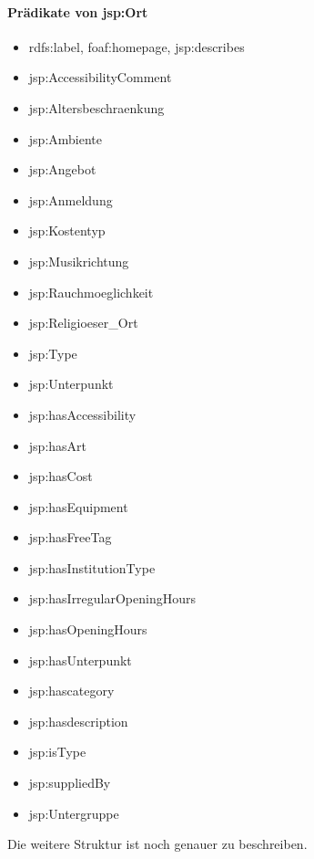 \documentclass[a4paper,11pt]{article}
\begin{document}
\paragraph{Prädikate von jsp:Ort}
\begin{itemize}
\item rdfs:label, foaf:homepage, jsp:describes
\item jsp:AccessibilityComment
\item jsp:Altersbeschraenkung
\item jsp:Ambiente
\item jsp:Angebot
\item jsp:Anmeldung
\item jsp:Kostentyp
\item jsp:Musikrichtung
\item jsp:Rauchmoeglichkeit
\item jsp:Religioeser\_Ort
\item jsp:Type
\item jsp:Unterpunkt
\item jsp:hasAccessibility
\item jsp:hasArt
\item jsp:hasCost
\item jsp:hasEquipment
\item jsp:hasFreeTag
\item jsp:hasInstitutionType
\item jsp:hasIrregularOpeningHours
\item jsp:hasOpeningHours
\item jsp:hasUnterpunkt
\item jsp:hascategory
\item jsp:hasdescription
\item jsp:isType
\item jsp:suppliedBy
\item jsp:Untergruppe
\end{itemize}

Die weitere Struktur ist noch genauer zu beschreiben. 
\end{document}
